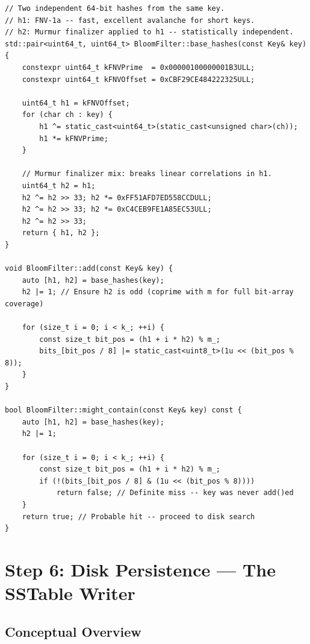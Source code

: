 \documentclass[11pt,a4paper]{article}
\begin{document}
\begin{lstlisting}[style=cpp, caption={Bloom Filter Double Hashing: \texttt{src/bloom\_filter.cpp}}]
// Two independent 64-bit hashes from the same key.
// h1: FNV-1a -- fast, excellent avalanche for short keys.
// h2: Murmur finalizer applied to h1 -- statistically independent.
std::pair<uint64_t, uint64_t> BloomFilter::base_hashes(const Key& key) {
    constexpr uint64_t kFNVPrime  = 0x00000100000001B3ULL;
    constexpr uint64_t kFNVOffset = 0xCBF29CE484222325ULL;

    uint64_t h1 = kFNVOffset;
    for (char ch : key) {
        h1 ^= static_cast<uint64_t>(static_cast<unsigned char>(ch));
        h1 *= kFNVPrime;
    }

    // Murmur finalizer mix: breaks linear correlations in h1.
    uint64_t h2 = h1;
    h2 ^= h2 >> 33; h2 *= 0xFF51AFD7ED558CCDULL;
    h2 ^= h2 >> 33; h2 *= 0xC4CEB9FE1A85EC53ULL;
    h2 ^= h2 >> 33;
    return { h1, h2 };
}

void BloomFilter::add(const Key& key) {
    auto [h1, h2] = base_hashes(key);
    h2 |= 1; // Ensure h2 is odd (coprime with m for full bit-array coverage)

    for (size_t i = 0; i < k_; ++i) {
        const size_t bit_pos = (h1 + i * h2) % m_;
        bits_[bit_pos / 8] |= static_cast<uint8_t>(1u << (bit_pos % 8));
    }
}

bool BloomFilter::might_contain(const Key& key) const {
    auto [h1, h2] = base_hashes(key);
    h2 |= 1;

    for (size_t i = 0; i < k_; ++i) {
        const size_t bit_pos = (h1 + i * h2) % m_;
        if (!(bits_[bit_pos / 8] & (1u << (bit_pos % 8))))
            return false; // Definite miss -- key was never add()ed
    }
    return true; // Probable hit -- proceed to disk search
}
\end{lstlisting}

\section{Step 6: Disk Persistence --- The SSTable Writer}
\label{sec:sstable_writer}

\subsection{Conceptual Overview}
\end{document}

